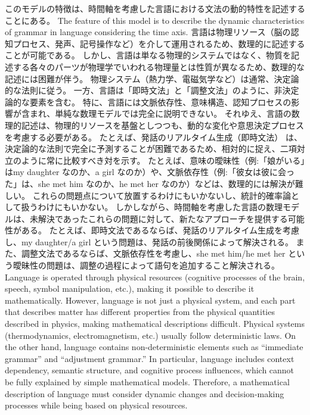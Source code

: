 \documentclass[a4paper,xelatex,ja=standard]{bxjsarticle}
\begin{document}
\ifJPN
このモデルの特徴は、時間軸を考慮した言語における文法の動的特性を記述することにある。
\else
The feature of this model is to describe the dynamic characteristics of grammar in language considering the time axis.
\fi
\ifJPN
言語は物理リソース（脳の認知プロセス、発声、記号操作など）を介して運用されるため、数理的に記述することが可能である。
しかし、言語は単なる物理的システムではなく、物質を記述する各々のパーツが物理学でいわれる物理量とは性質が異なるため、数理的な記述には困難が伴う。
物理システム（熱力学、電磁気学など）は通常、決定論的な法則に従う。
一方、言語は「即時文法」と「調整文法」のように、非決定論的な要素を含む。
特に、言語には文脈依存性、意味構造、認知プロセスの影響が含まれ、単純な数理モデルでは完全に説明できない。
それゆえ、言語の数理的記述は、物理的リソースを基盤としつつも、動的な変化や意思決定プロセスを考慮する必要がある。
たとえば、発話のリアルタイム生成（即時文法） は、決定論的な法則で完全に予測することが困難であるため、相対的に捉え、二項対立のように常に比較すべき対を示す。
たとえば、意味の曖昧性（例:「娘がいる」はmy daughter なのか、a girl なのか）や、文脈依存性（例:「彼女は彼に会った」は、she met him なのか、he met her なのか）などは、数理的には解決が難しい。
これらの問題点について放置するわけにもいかないし、統計的確率論として扱うわけにもいかない。
しかしながら、時間軸を考慮した言語の数理モデルは、未解決であったこれらの問題に対して、新たなアプローチを提供する可能性がある。
たとえば、即時文法であるならば、発話のリアルタイム生成を考慮し、my daughter/a girl という問題は、発話の前後関係によって解決される。
また、調整文法であるならば、文脈依存性を考慮し、she met him/he met her という曖昧性の問題は、調整の過程によって語句を追加すること解決される。
    \else
    Language is operated through physical resources (cognitive processes of the brain, speech, symbol manipulation, etc.), making it possible to describe it mathematically.
However, language is not just a physical system, and each part that describes matter has different properties from the physical quantities described in physics, making mathematical descriptions difficult.
Physical systems (thermodynamics, electromagnetism, etc.) usually follow deterministic laws.
On the other hand, language contains non-deterministic elements such as ``immediate grammar'' and ``adjustment grammar.''
In particular, language includes context dependency, semantic structure, and cognitive process influences, which cannot be fully explained by simple mathematical models.
Therefore, a mathematical description of language must consider dynamic changes and decision-making processes while being based on physical resources.
\end{document}
